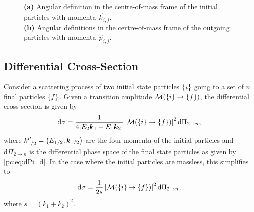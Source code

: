 \documentclass[../main.tex]{subfiles}
\begin{document}
\begin{figure}
  \centering
  \begin{subfigure}{.49\textwidth}
    \centering
    \caption{}
    \label{pc:subfig:3body_kinematics_a}
  \end{subfigure}
  \hfill
  \begin{subfigure}{.49\textwidth}
    \centering
    \caption{}
    \label{pc:subfig:3body_kinematics_b}
  \end{subfigure}
  \caption{\\
    \textbf{(a)} Angular definition in the centre-of-mass frame of the
    initial particles with momenta \(\vec{k}_{i,j}\).\\
    \textbf{(b)} Angular definitions in the centre-of-mass frame of the
    outgoing particles with momenta \(\vec{p}_{i,j}\).}
  \label{pc:fig:3body_kinematics}
\end{figure}


\subsection{Differential Cross-Section}
Consider a scattering process of two initial state particles \(\left\{i\right\}\) going to a set of \(n\) final particles \(\left\{f\right\}\).
Given a transition amplitude \(\mathcal{M}(\left\{i\right\} \to \left\{f\right\})\), the differential cross-section is given by~\cite{Schwartz:2014sze}
\begin{equation}
  \mathrm{d}\sigma = \frac{1}{4|E_2 \boldsymbol{k}_1 - E_1\boldsymbol{k}_2|} \left|\mathcal{M}(\left\{i\right\} \to \left\{f\right\})\right|^2 \mathrm{d}\Pi_{2 \to n},
\end{equation}
where \(k_{1/2}^\mu = \left(E_{1/2}, \boldsymbol{k}_{1/2}\right)\) are the four-momenta of the initial particles and \(\mathrm{d}\Pi_{2 \to n}\) is the differential phase space of the final state particles as given by \cref{pc:eq:dPi_d}.
In the case where the initial particles are massless, this simplifies to
\begin{equation}
  \label{pc:eq:diff_xsec_formula}
  \mathrm{d}\sigma = \frac{1}{2s} \left|\mathcal{M}(\left\{i\right\} \to \left\{f\right\})\right|^2 \mathrm{d}\Pi_{2 \to n},
\end{equation}
where \(s = (k_1 + k_2)^2\).
\end{document}
